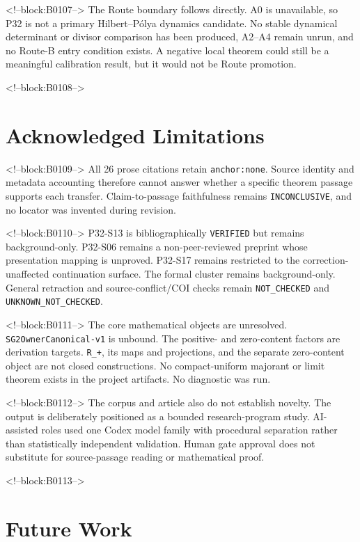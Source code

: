 \documentclass[11pt]{article}
\begin{document}
<!--block:B0107-->
The Route boundary follows directly. A0 is unavailable, so P32 is not a
primary Hilbert--Pólya dynamics candidate. No stable dynamical
determinant or divisor comparison has been produced, A2--A4 remain
unrun, and no Route-B entry condition exists. A negative local theorem
could still be a meaningful calibration result, but it would not be
Route promotion.

<!--block:B0108-->
\hypertarget{8-acknowledged-limitations}{%
\section{Acknowledged
Limitations}\label{8-acknowledged-limitations}}

<!--block:B0109-->
All 26 prose citations retain \texttt{anchor:none}. Source identity and
metadata accounting therefore cannot answer whether a specific theorem
passage supports each transfer. Claim-to-passage faithfulness remains
\texttt{INCONCLUSIVE}, and no locator was invented during revision.

<!--block:B0110-->
P32-S13 is bibliographically \texttt{VERIFIED} but remains background-only. P32-S06 remains
a non-peer-reviewed preprint whose presentation mapping is unproved.
P32-S17 remains restricted to the correction-unaffected continuation
surface. The formal cluster remains background-only. General retraction
and source-conflict/COI checks remain \texttt{NOT\_CHECKED} and
\texttt{UNKNOWN\_NOT\_CHECKED}.

<!--block:B0111-->
The core mathematical objects are unresolved.
\texttt{SG2OwnerCanonical-v1} is unbound. The positive- and zero-content
factors are derivation targets. \texttt{R\_+}, its maps and projections,
and the separate zero-content object are not closed constructions. No
compact-uniform majorant or limit theorem exists in the project
artifacts. No diagnostic was run.

<!--block:B0112-->
The corpus and article also do not establish novelty. The output is
deliberately positioned as a bounded research-program study.
AI-assisted roles used one Codex model family with procedural separation
rather than statistically independent validation. Human gate approval
does not substitute for source-passage reading or mathematical proof.

<!--block:B0113-->
\hypertarget{9-future-work}{%
\section{Future Work}\label{9-future-work}}
\end{document}
